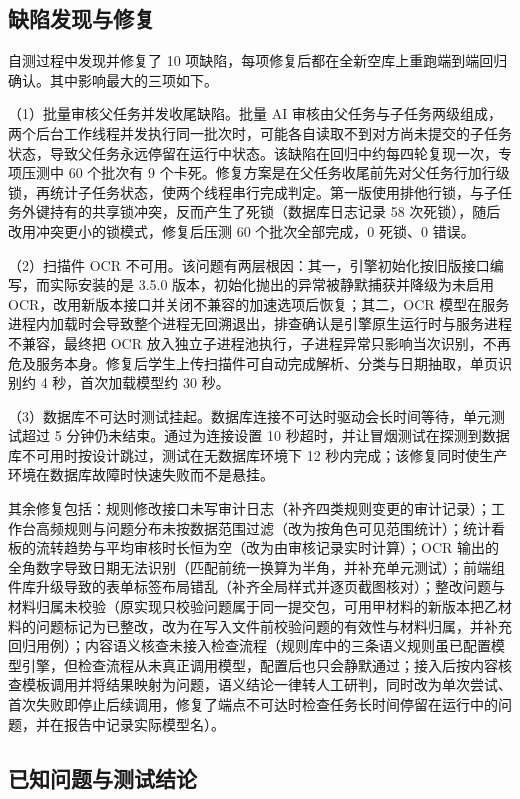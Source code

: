 \documentclass[12pt,a4paper]{ctexart}
\begin{document}
\subsection{缺陷发现与修复}

自测过程中发现并修复了 10 项缺陷，每项修复后都在全新空库上重跑端到端回归确认。其中影响最大的三项如下。

（1）批量审核父任务并发收尾缺陷。批量 AI 审核由父任务与子任务两级组成，两个后台工作线程并发执行同一批次时，可能各自读取不到对方尚未提交的子任务状态，导致父任务永远停留在运行中状态。该缺陷在回归中约每四轮复现一次，专项压测中 60 个批次有 9 个卡死。修复方案是在父任务收尾前先对父任务行加行级锁，再统计子任务状态，使两个线程串行完成判定。第一版使用排他行锁，与子任务外键持有的共享锁冲突，反而产生了死锁（数据库日志记录 58 次死锁），随后改用冲突更小的锁模式，修复后压测 60 个批次全部完成，0 死锁、0 错误。

（2）扫描件 OCR 不可用。该问题有两层根因：其一，引擎初始化按旧版接口编写，而实际安装的是 3.5.0 版本，初始化抛出的异常被静默捕获并降级为未启用 OCR，改用新版本接口并关闭不兼容的加速选项后恢复；其二，OCR 模型在服务进程内加载时会导致整个进程无回溯退出，排查确认是引擎原生运行时与服务进程不兼容，最终把 OCR 放入独立子进程池执行，子进程异常只影响当次识别，不再危及服务本身。修复后学生上传扫描件可自动完成解析、分类与日期抽取，单页识别约 4 秒，首次加载模型约 30 秒。

（3）数据库不可达时测试挂起。数据库连接不可达时驱动会长时间等待，单元测试超过 5 分钟仍未结束。通过为连接设置 10 秒超时，并让冒烟测试在探测到数据库不可用时按设计跳过，测试在无数据库环境下 12 秒内完成；该修复同时使生产环境在数据库故障时快速失败而不是悬挂。

其余修复包括：规则修改接口未写审计日志（补齐四类规则变更的审计记录）；工作台高频规则与问题分布未按数据范围过滤（改为按角色可见范围统计）；统计看板的流转趋势与平均审核时长恒为空（改为由审核记录实时计算）；OCR 输出的全角数字导致日期无法识别（匹配前统一换算为半角，并补充单元测试）；前端组件库升级导致的表单标签布局错乱（补齐全局样式并逐页截图核对）；整改问题与材料归属未校验（原实现只校验问题属于同一提交包，可用甲材料的新版本把乙材料的问题标记为已整改，改为在写入文件前校验问题的有效性与材料归属，并补充回归用例）；内容语义核查未接入检查流程（规则库中的三条语义规则虽已配置模型引擎，但检查流程从未真正调用模型，配置后也只会静默通过；接入后按内容核查模板调用并将结果映射为问题，语义结论一律转人工研判，同时改为单次尝试、首次失败即停止后续调用，修复了端点不可达时检查任务长时间停留在运行中的问题，并在报告中记录实际模型名）。

\subsection{已知问题与测试结论}
\end{document}
